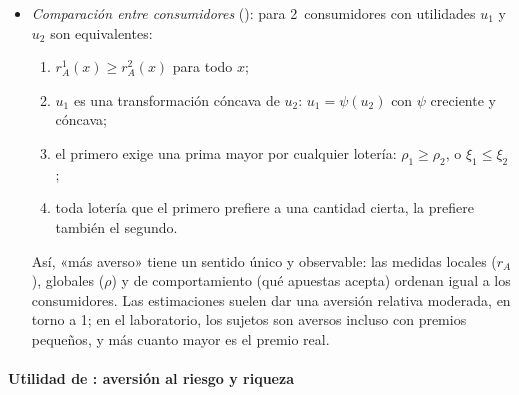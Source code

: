 \documentclass[11pt]{article}
\begin{document}
\begin{itemize}
\begin{equation}
  \rho\ \approx\ \tfrac{1}{2}\,\sigma^2\,r_A\big(\overline{W}\big).
  \end{equation}
  En el ejemplo anterior ($r_A(x)=1/(2x)$, $\sigma=24$, media 40), la aproximación da $\tfrac12\cdot 576/80=3{,}6$, frente a la prima exacta de 4: el riesgo no es pequeño.
\item \emph{Comparación entre consumidores} (): para 2~consumidores con utilidades $u_1$ y $u_2$ son equivalentes\nocite{Pratt1964Risk}:
  \begin{enumerate}
  \item $r_A^1(x)\geq r_A^2(x)$ para todo $x$;
  \item $u_1$ es una transformación cóncava de $u_2$: $u_1=\psi(u_2)$ con $\psi$ creciente y cóncava;
  \item el primero exige una prima mayor por cualquier lotería: $\rho_1\geq\rho_2$, o $\xi_1\leq\xi_2$;
  \item toda lotería que el primero prefiere a una cantidad cierta, la prefiere también el segundo.
  \end{enumerate}
  Así, «más averso» tiene un sentido único y observable: las medidas locales ($r_A$), globales ($\rho$) y de comportamiento (qué apuestas acepta) ordenan igual a los consumidores. Las estimaciones suelen dar una aversión relativa moderada, en torno a 1\nocite{Chetty2006New}; en el laboratorio, los sujetos son aversos incluso con premios pequeños, y más cuanto mayor es el premio real\nocite{HoltLaury2002Risk}.
\end{itemize}

\paragraph{Utilidad de : aversión al riesgo y riqueza}
\end{document}
